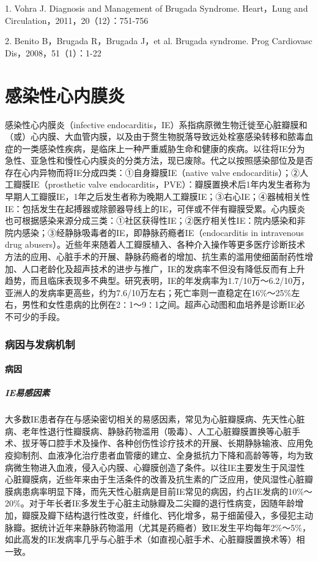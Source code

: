 1. Vohra J. Diagnosis and Management of Brugada Syndrome. Heart，Lung
and Circulation，2011，20（12）：751-756

2. Benito B，Brugada R，Brugada J，et al. Brugada syndrome. Prog
Cardiovasc Dis，2008，51（1）：1-22

\protect\hypertarget{text00300.html}{}{}

\chapter{感染性心内膜炎}

感染性心内膜炎（infective
endocarditis，IE）系指病原微生物迁徙至心脏瓣膜和（或）心内膜、大血管内膜，以及由于赘生物脱落导致远处栓塞感染转移和脓毒血症的一类感染性疾病，是临床上一种严重威胁生命和健康的疾病。以往将IE分为急性、亚急性和慢性心内膜炎的分类方法，现已废除。代之以按照感染部位及是否存在心内异物而将IE分成四类：①自身瓣膜IE（native
valve endocarditis）；②人工瓣膜IE（prosthetic valve
endocarditis，PVE）：瓣膜置换术后1年内发生者称为早期人工瓣膜IE，1年之后发生者称为晚期人工瓣膜IE；③右心IE；④器械相关性IE：包括发生在起搏器或除颤器导线上的IE，可伴或不伴有瓣膜受累。心内膜炎也可根据感染来源分成三类：①社区获得性IE；②医疗相关性IE：院内感染和非院内感染；③经静脉吸毒者的IE，即静脉药瘾者IE（endocarditis
in intravenous drug
abusers）。近些年来随着人工瓣膜植入、各种介入操作等更多医疗诊断技术方法的应用、心脏手术的开展、静脉药瘾者的增加、抗生素的滥用使细菌耐药性增加、人口老龄化及超声技术的进步与推广，IE的发病率不但没有降低反而有上升趋势，而且临床表现多不典型。研究表明，IE的年发病率为1.7/10万～6.2/10万，亚洲人的发病率更高些，约为7.6/10万左右；死亡率则一直稳定在16\%～25\%左右，男性和女性患病的比例在2∶1～9∶1之间。超声心动图和血培养是诊断IE必不可少的手段。

\subsection{病因与发病机制}

\subsubsection{病因}

\paragraph{IE易感因素}

大多数IE患者存在与感染密切相关的易感因素，常见为心脏瓣膜病、先天性心脏病、老年性退行性瓣膜病、静脉药物滥用（吸毒）、人工心脏瓣膜置换等心脏手术、拔牙等口腔手术及操作、各种创伤性诊疗技术的开展、长期静脉输液、应用免疫抑制剂、血液净化治疗患者血管瘘的建立、全身抵抗力下降和高龄等等，均为致病微生物进入血液，侵入心内膜、心瓣膜创造了条件。以往IE主要发生于风湿性心脏瓣膜病，近些年来由于生活条件的改善及抗生素的广泛应用，使风湿性心脏瓣膜病患病率明显下降，而先天性心脏病是目前IE常见的病因，约占IE发病的10\%～20\%。对于年长者IE多发生于心脏主动脉瓣及二尖瓣的退行性病变，因随年龄增加，瓣膜及瓣下结构退行性改变，纤维化、钙化增多，易于细菌侵入，多侵犯主动脉瓣。据统计近年来静脉药物滥用（尤其是药瘾者）致IE发生平均每年2\%～5\%，如此高发的IE发病率几乎与心脏手术（如直视心脏手术、心脏瓣膜置换术等）相一致。

